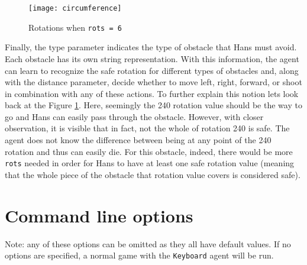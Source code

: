 \begin{figure}[h]
    \centering
    \texttt{[image: circumference]}
    \caption{Rotations when \texttt{rots = 6}}
    \label{fig:circumference}
\end{figure}

Finally, the type parameter indicates the type of obstacle that Hans must avoid. Each obstacle has its own string representation. With this information, the agent can learn to recognize the safe rotation for different types of obstacles and, along with the distance parameter, decide whether to move left, right, forward, or shoot in combination with any of these actions. To further explain this notion lets look back at the Figure \ref{fig:circumference}. Here, seemingly the 240 rotation value should be the way to go and Hans can easily pass through the obstacle. However, with closer observation, it is visible that in fact, not the whole of rotation 240 is safe. The agent does not know the difference between being at any point of the 240 rotation and thus can easily die. For this obstacle, indeed, there would be more \texttt{rots} needed in order for Hans to have at least one safe rotation value (meaning that the whole piece of the obstacle that rotation value covers is considered safe).

\section{Command line options}
\label{commOpt}
\begin{center}
\end{center}
Note: any of these options can be omitted as they all have default values. If no options are specified, a normal game with the \texttt{Keyboard} agent will be run.
